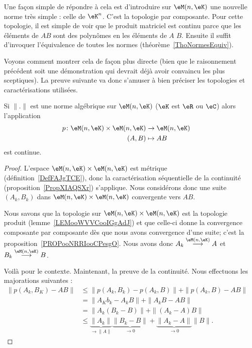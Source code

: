 Une façon simple de répondre à cela est d'introduire sur \( \eM(n,\eK)\) une nouvelle norme très simple : celle de \( \eK^n\). C'est la topologie par composante. Pour cette topologie, il est simple de voir que le produit matriciel est continu parce que les éléments de \( AB\) sont des polynômes en les éléments de \( A\) \( B\). Ensuite il suffit d'invoquer l'équivalence de toutes les normes (théorème~\ref{ThoNormesEquiv}).

Voyons comment montrer cela de façon plus directe (bien que le raisonnement précédent soit une démonstration qui devrait déjà avoir convaincu les plus sceptiques). La preuve suivante va donc s'amuser à bien préciser les topologies et caractérisations utilisées.

\begin{lemma}
    Si \( \| . \|\) est une norme algébrique sur \( \eM(n,\eK)\) (\( \eK\) est \( \eR\) ou \( \eC\)) alors l'application
    \begin{equation}
        \begin{aligned}
            p\colon \eM(n,\eK)\times \eM(n,\eK)&\to \eM(n,\eK) \\
            (A,B)&\mapsto AB
        \end{aligned}
    \end{equation}
    est continue.
\end{lemma}

\begin{proof}
    L'espace \( \eM(n,\eK)\times \eM(n,\eK)\) est métrique (définition~\ref{DefFAJgTCE}), donc la caractérisation séquentielle de la continuité (proposition~\ref{PropXIAQSXr}) s'applique. Nous considérons donc une suite \( (A_k,B_k)\) dans \( \eM(n,\eK)\times \eM(n,\eK)\) convergente vers \( AB\).

    Nous savons que la topologie sur \( \eM(n,\eK)\times \eM(n,\eK)\) est la topologie produit (lemme~\ref{LEMooWVVCooIGgAdJ}) et que celle-ci donne la convergence composante par composante dès que nous avons convergence d'une suite; c'est la proposition~\ref{PROPooNRRIooCPesgO}. Nous avons donc \( A_k\stackrel{\eM(n,\eK)}{\longrightarrow}A\) et \( B_k\stackrel{\eM(n,\eK)}{\longrightarrow}B\).

    Voilà pour le contexte. Maintenant, la preuve de la continuité. Nous effectuons les majorations suivantes :
    \begin{subequations}
        \begin{align}
            \| p(A_k,B_K)-AB \|&\leq \| p(A_k,B_k)-p(A_k,B) \|+\| p(A_k,B)-AB \|\\
            &=\| A_Kb_k-A_kB \|+\| A_kB-AB \|\\
            &=\| A_k(B_k-B) \|+\| (A_k-A)B \|\\
            &\leq \underbrace{\| A_k \|}_{\to \| A \|}\underbrace{\| B_k-B \|}_{\to 0}+\underbrace{\| A_k-A \|}_{\to 0}\| B \|.
        \end{align}
    \end{subequations}
\end{proof}

